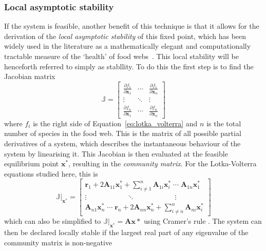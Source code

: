 \subsubsection{Local asymptotic stability}
If the system is feasible, another benefit of this technique is that it allows for the derivation of the \emph{local asymptotic stability} of this fixed point, which has been widely used in the literature as a mathematically elegant and computationally tractable measure of the `health' of food webs~\cite{May1973, Emmerson2004}. This local stability will be henceforth referred to simply as stabllity. 
To do this the first step is to find the Jacobian matrix
\begin{equation}
  \mathbb{J} = \begin{bmatrix}
    \frac{\partial f_1}{\partial \mathbf{x}_1} & 
    \cdots &
    \frac{\partial f_1}{\partial \mathbf{x}_n} \\
    \vdots &
    \ddots &
    \vdots \\
    \frac{\partial f_n}{\partial \mathbf{x}_1} & 
    \cdots &
    \frac{\partial f_n}{\partial \mathbf{x}_n}
  \end{bmatrix}
\end{equation}
where $f_i$ is the right side of Equation~\eqref{eq:lotka_volterra} and $n$ is the total number of species in the food web.
This is the matrix of all possible partial derivatives of a system, which describes the instantaneous behaviour of the system by linearising it. This Jacobian is then evaluated at the feasible equilibrium point $\mathbf{x}^*$, resulting in the \emph{community matrix}. For the Lotka-Volterra equations studied here, this is
\begin{equation}
  \mathbb{J}|_\mathbf{x^*} = \begin{bmatrix}
    \mathbf{r}_1 + 2\mathbf{A}_{11}\mathbf{x}_1^* + \sum_{i\neq 1}^n\mathbf{A}_{1i}\mathbf{x}_i^*
    \;\cdots\;
    \mathbf{A}_{1n}\mathbf{x}_1^*\\
    \vdots 
    \qquad\qquad\quad\;\;\ddots\qquad\qquad\quad\;\;
    \vdots \\
    \mathbf{A}_{n1}\mathbf{x}_n^*
    \;\cdots\;
    \mathbf{r}_n + 2\mathbf{A}_{nn}\mathbf{x}_n^* + \sum_{i\neq n}^n\mathbf{A}_{ni}\mathbf{x}_i^* 
  \end{bmatrix}
  \label{eq:jacobian_evaluated}
\end{equation}
which can also be simplified to $\mathbb{J}|_\mathbf{x^*} = \mathbf{Ax*}$ using Cramer's rule \cite{TODO}.
The system can then be declared locally stable if the largest real part of any eigenvalue of the community matrix is non-negative
